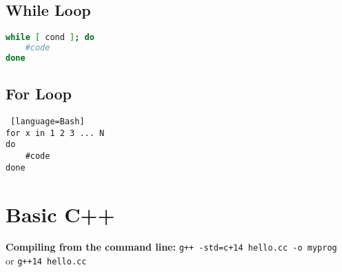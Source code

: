 \documentclass[12pt]{article}
\begin{document}
\subsection{While Loop}
\begin{lstlisting}[language=Bash]
while [ cond ]; do
    #code
done
\end{lstlisting}


\subsection{For Loop}
\begin{lstlisting} [language=Bash]
for x in 1 2 3 ... N
do
    #code
done
\end{lstlisting}


\section{Basic C++}

\textbf{Compiling from the command line:} 
\lstinline{g++ -std=c+14 hello.cc -o myprog} \\
or \lstinline{g++14 hello.cc}
\end{document}

